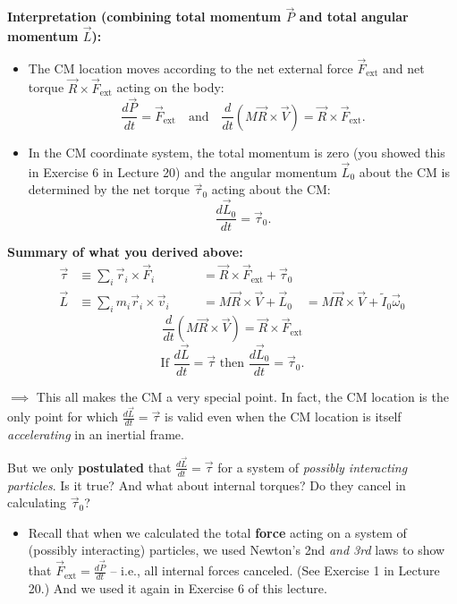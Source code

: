 \documentclass[11pt, letterpaper, openany]{book}
\begin{document}
\textbf{Interpretation (combining total momentum $\vec{P}$ and total angular momentum $\vec{L}$):}
\begin{itemize}
    \item The CM location moves according to the net external force $\vec{F}_{\text{ext}}$ and net torque $\vec{R} \times \vec{F}_{\text{ext}}$ acting on the body:
    \[ \frac{d\vec{P}}{dt} = \vec{F}_{\text{ext}} \quad \text{and} \quad \frac{d}{dt}(M\vec{R} \times \vec{V}) = \vec{R} \times \vec{F}_{\text{ext}}. \]
    
    \item In the CM coordinate system, the total momentum is zero (you showed this in Exercise 6 in Lecture 20) and the angular momentum $\vec{L}_0$ about the CM is determined by the net torque $\vec{\tau}_0$ acting about the CM:
    \[ \frac{d\vec{L}_0}{dt} = \vec{\tau}_0. \]
\end{itemize}

\textbf{Summary of what you derived above:}
\begin{align*}
    \vec{\tau} &\equiv \sum_i \vec{r}_i \times \vec{F}_i \quad &&= \vec{R} \times \vec{F}_{\text{ext}} + \vec{\tau}_0 \\
    \vec{L} &\equiv \sum_i m_i\vec{r}_i \times \vec{v}_i \quad &&= M\vec{R} \times \vec{V} + \vec{L}_0 \quad = M\vec{R} \times \vec{V} + \tilde{I}_0\vec{\omega}_0
\end{align*}
\[ \frac{d}{dt}(M\vec{R} \times \vec{V}) = \vec{R} \times \vec{F}_{\text{ext}} \]
\[ \text{If } \frac{d\vec{L}}{dt} = \vec{\tau} \text{ then } \frac{d\vec{L}_0}{dt} = \vec{\tau}_0. \]

$\implies$ This all makes the CM a very special point. In fact, the CM location is the only point for which $\frac{d\vec{L}}{dt} = \vec{\tau}$ is valid even when the CM location is itself \textit{accelerating} in an inertial frame.

But we only \textbf{postulated} that $\frac{d\vec{L}}{dt} = \vec{\tau}$ for a system of \textit{possibly interacting particles}. Is it true? And what about internal torques? Do they cancel in calculating $\vec{\tau}_0$?

\begin{itemize}
    \item Recall that when we calculated the total \textbf{force} acting on a system of (possibly interacting) particles, we used Newton's 2nd \textit{and 3rd} laws to show that $\vec{F}_{\text{ext}} = \frac{d\vec{P}}{dt}$ -- i.e., all internal forces canceled. (See Exercise 1 in Lecture 20.) And we used it again in Exercise 6 of this lecture.
\end{itemize}
\end{document}
